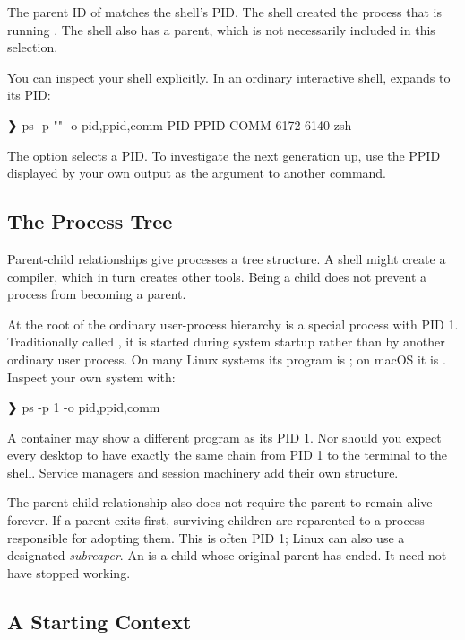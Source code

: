 \documentclass[11pt]{article}
\begin{document}
The parent ID of  matches the shell's PID.
The shell created the process that is running .
The shell also has a parent, which is not necessarily included in this selection.

You can inspect your shell explicitly.
In an ordinary interactive shell, \inlinesh{$$} expands to its PID:

\begin{terminal}[unbreakable]
❯ ps -p "$$" -o pid,ppid,comm
  PID  PPID COMM
 6172  6140 zsh
\end{terminal}

The  option selects a PID.
To investigate the next generation up, use the PPID displayed by your own output as the argument to another  command.

\subsection{The Process Tree}

Parent-child relationships give processes a tree structure.
A shell might create a compiler, which in turn creates other tools.
Being a child does not prevent a process from becoming a parent.

At the root of the ordinary user-process hierarchy is a special process with PID 1.
Traditionally called , it is started during system startup rather than by another ordinary user process.
On many Linux systems its program is ; on macOS it is .
Inspect your own system with:

\begin{terminal}[unbreakable]
❯ ps -p 1 -o pid,ppid,comm
\end{terminal}

A container may show a different program as its PID 1.
Nor should you expect every desktop to have exactly the same chain from PID 1 to the terminal to the shell.
Service managers and session machinery add their own structure.

The parent-child relationship also does not require the parent to remain alive forever.
If a parent exits first, surviving children are reparented to a process responsible for adopting them.
This is often PID 1; Linux can also use a designated \emph{subreaper}.
An  is a child whose original parent has ended.
It need not have stopped working.

\subsection{A Starting Context}
\end{document}
